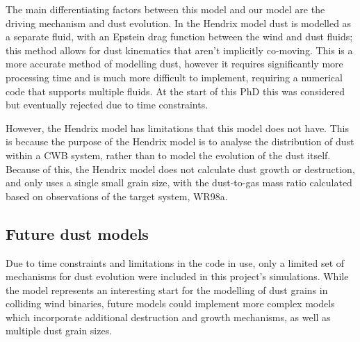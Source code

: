 
The main differentiating factors between this model and our model are the driving mechanism and dust evolution.
In the Hendrix model dust is modelled as a separate fluid, with an Epstein drag function between the wind and dust fluids; this method allows for dust kinematics that aren't implicitly co-moving.
This is a more accurate method of modelling dust, however it requires significantly more processing time and is much more difficult to implement, requiring a numerical code that supports multiple fluids.
At the start of this PhD this was considered but eventually rejected due to time constraints.

However, the Hendrix model has limitations that this model does not have.
This is because the purpose of the Hendrix model is to analyse the distribution of dust within a CWB system, rather than to model the evolution of the dust itself.
Because of this, the Hendrix model does not calculate dust growth or destruction, and only uses a single small grain size, with the dust-to-gas mass ratio calculated based on observations of the target system, WR98a.

\subsection{Future dust models}
\label{sec:futuredustmodels}


Due to time constraints and limitations in the code in use, only a limited set of mechanisms for dust evolution were included in this project's simulations.
While the \bidmas{} model represents an interesting start for the modelling of dust grains in colliding wind binaries, future models could implement more complex models which incorporate additional destruction and growth mechanisms, as well as multiple dust grain sizes.

